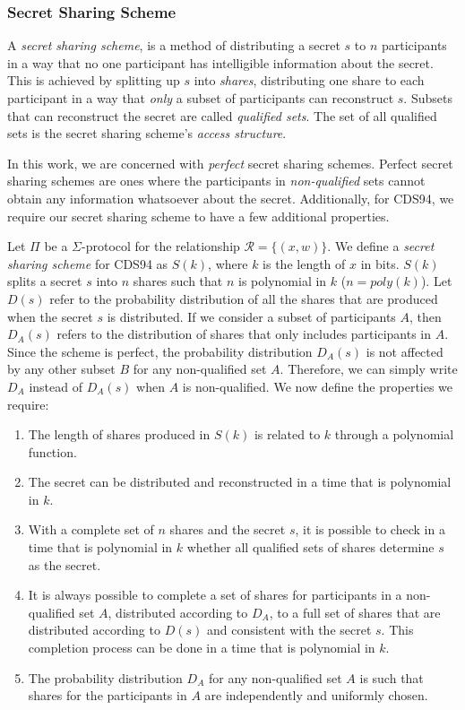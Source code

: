 \subsubsection{Secret Sharing Scheme}
A \textit{secret sharing scheme}, is a method of distributing a secret $s$ to $n$ participants in a way that no one participant has intelligible information about the secret. This is achieved by splitting up $s$ into \textit{shares}, distributing one share to each participant in a way that \textit{only} a subset of participants can reconstruct $s$. Subsets that can reconstruct the secret are called \textit{qualified sets}. The set of all qualified sets is the secret sharing scheme's \textit{access structure}.

In this work, we are concerned with \textit{perfect} secret sharing schemes. Perfect secret sharing schemes are ones where the participants in \textit{non-qualified} sets cannot obtain any information whatsoever about the secret. Additionally, for CDS94, we require our secret sharing scheme to have a few additional properties. 

\begin{definition}\label{def:secret-sharing}
Let $\Pi$ be a $\Sigma$-protocol for the relationship $\mathcal R = \{(x,w)\}$. We define a \textit{secret sharing scheme} for CDS94 as $S(k)$, where $k$ is the length of $x$ in bits. $S(k)$ splits a secret $s$ into $n$ shares such that $n$ is polynomial in $k$ ($n = poly(k)$). Let $D(s)$ refer to the probability distribution of all the shares that are produced when the secret $s$ is distributed. If we consider a subset of participants $A$, then $D_A(s)$ refers to the distribution of shares that only includes participants in $A$. Since the scheme is perfect, the probability distribution $D_A(s)$ is not affected by any other subset $B$ for any non-qualified set $A$. Therefore, we can simply write $D_A$ instead of $D_A(s)$ when $A$ is non-qualified. We now define the properties we require:
    \begin{enumerate}
        \item The length of shares produced in $S(k)$ is related to $k$ through a polynomial function.
        \item The secret can be distributed and reconstructed in a time that is polynomial in $k$.
        \item With a complete set of $n$ shares and the secret $s$, it is possible to check in a time that is polynomial in $k$ whether all qualified sets of shares determine $s$ as the secret.
        \item It is always possible to complete a set of shares for participants in a non-qualified set $A$, distributed according to $D_A$, to a full set of shares that are distributed according to $D(s)$ and consistent with the secret $s$. This completion process can be done in a time that is polynomial in $k$.
        \item The probability distribution $D_A$ for any non-qualified set $A$ is such that shares for the participants in $A$ are independently and uniformly chosen.
    \end{enumerate}
\end{definition}

